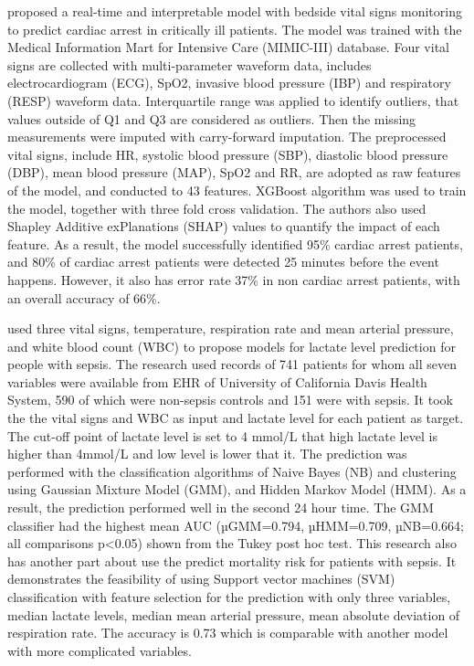 \documentclass[12pt,a4paper,english
]{tunithesis}
\begin{document}
\textcite{yijing2022} proposed a real-time and interpretable model with bedside vital signs monitoring to predict cardiac arrest in critically ill patients. The model was trained with the Medical Information Mart for Intensive Care (MIMIC-III) database. Four vital signs are collected with multi-parameter waveform data, includes electrocardiogram (ECG), SpO2, invasive blood pressure (IBP) and respiratory (RESP) waveform data. Interquartile range was applied to identify outliers, that values outside of Q1 and Q3 are considered as outliers. Then the missing measurements were imputed with carry-forward imputation. The preprocessed vital signs, include HR, systolic blood pressure (SBP), diastolic blood pressure (DBP), mean blood pressure (MAP), SpO2 and RR, are adopted as raw features of the model, and conducted to 43 features. XGBoost algorithm was used to train the model, together with three fold cross validation. The authors also used Shapley Additive exPlanations (SHAP) values to quantify the impact of each feature. As a result, the model successfully identified 95\% cardiac arrest patients, and 80\% of cardiac arrest patients were detected 25 minutes before the event happens. However, it also has error rate 37\% in non cardiac arrest patients, with an overall accuracy of 66\%.

\textcite{gultepe2013} used three vital signs, temperature, respiration rate and mean arterial pressure, and white blood count (WBC) to propose models for lactate level prediction for people with sepsis. The research used records of 741 patients for whom all seven variables were available from EHR of University of California Davis Health System, 590 of which were non-sepsis controls and 151 were with sepsis. It took the the vital signs and WBC as input and lactate level for each patient as target. The cut-off point of lactate level is set to 4 mmol/L that high lactate level is higher than 4mmol/L and low level is lower that it. The prediction was performed with the classification algorithms of Naive Bayes (NB) and clustering using Gaussian Mixture Model (GMM), and Hidden Markov Model (HMM). As a result, the prediction performed well in the second 24 hour time. The GMM classifier had the highest mean AUC (µGMM=0.794, µHMM=0.709, µNB=0.664; all comparisons p<0.05) shown from the Tukey post hoc test. This research also has another part about use the predict mortality risk for patients with sepsis. It demonstrates the feasibility of using Support vector machines (SVM) classification with feature selection for the prediction with only three variables, median lactate levels, median mean arterial pressure, mean absolute deviation of respiration rate. The accuracy is 0.73 which is comparable with another model with more complicated variables.
\end{document}
